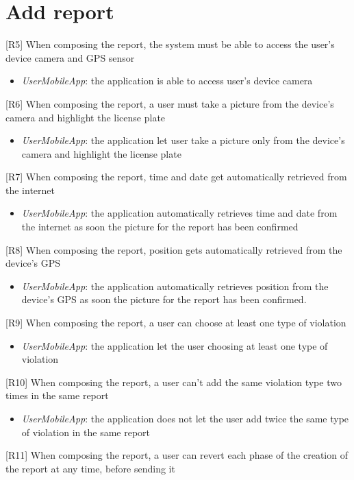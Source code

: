 		\section{Add report}
			{[R5]} When composing the report, the system must be able to access the user's device camera and GPS sensor
					\begin{itemize}
						\item \textit{UserMobileApp}: the application is able to access user's device camera
					\end{itemize}
			{[R6]} When composing the report, a user must take a picture from the device's camera and highlight the license plate
					\begin{itemize}
						\item \textit{UserMobileApp}: the application let user take a picture only from the device's camera and highlight the license plate
					\end{itemize}
			{[R7]} When composing the report, time and date get automatically retrieved from the internet
					\begin{itemize}
						\item \textit{UserMobileApp}:  the application automatically retrieves time and date from the internet as soon the picture for the report has been confirmed
					\end{itemize}
			{[R8]} When composing the report, position gets automatically retrieved from the device's GPS
					\begin{itemize}
						\item \textit{UserMobileApp}: the application automatically retrieves position from the device's GPS as soon the picture for the report has been confirmed.
					\end{itemize}
			{[R9]} When composing the report, a user can choose at least one type of violation
					\begin{itemize}
						\item \textit{UserMobileApp}: the application let the user choosing at least one type of violation
					\end{itemize}
			{[R10]} When composing the report, a user can't add the same violation type two times in the same report
					\begin{itemize}
						\item \textit{UserMobileApp}: the application does not let the user add twice the same type of violation in the same report
					\end{itemize}
			{[R11]} When composing the report, a user can revert each phase of the creation of the report at any time, before sending it
